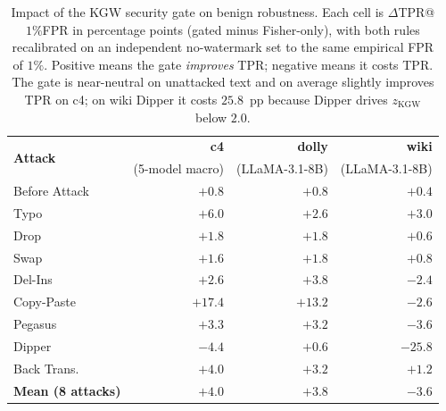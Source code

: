 %

\begin{table}[t]
\centering
\small
\setlength{\tabcolsep}{5pt}
\renewcommand{\arraystretch}{1.08}
\caption{Impact of the KGW security gate on benign robustness.
Each cell is $\Delta$TPR@$1\%$FPR in percentage points (gated minus Fisher-only),
with both rules recalibrated on an independent no-watermark set to the same
empirical FPR of $1\%$.
Positive means the gate \emph{improves} TPR; negative means it costs TPR.
The gate is near-neutral on unattacked text and on average slightly improves
TPR on c4; on wiki Dipper it costs $25.8$~pp because Dipper drives
$z_{\mathrm{KGW}}$ below $2.0$.}
\label{tab:gate_effect}
\begin{tabular}{lrrr}
\toprule
\multirow{2}{*}{\textbf{Attack}} & \textbf{c4} & \textbf{dolly} & \textbf{wiki} \\
 & \scriptsize(5-model macro) & \scriptsize(LLaMA-3.1-8B) & \scriptsize(LLaMA-3.1-8B) \\
\midrule
Before Attack      & $+0.8$ & $+0.8$ & $+0.4$ \\
\midrule
Typo               & $+6.0$ & $+2.6$ & $+3.0$ \\
Drop               & $+1.8$ & $+1.8$ & $+0.6$ \\
Swap               & $+1.6$ & $+1.8$ & $+0.8$ \\
Del-Ins            & $+2.6$ & $+3.8$ & $-2.4$ \\
Copy-Paste         & $+17.4$ & $+13.2$ & $-2.6$ \\
Pegasus            & $+3.3$ & $+3.2$ & $-3.6$ \\
Dipper             & $-4.4$ & $+0.6$ & $\mathbf{-25.8}$ \\
Back Trans.        & $+4.0$ & $+3.2$ & $+1.2$ \\
\midrule
\rowcolor{gray!12}
\textbf{Mean (8 attacks)} & $\mathbf{+4.0}$ & $\mathbf{+3.8}$ & $\mathbf{-3.6}$ \\
\bottomrule
\end{tabular}
\end{table}
